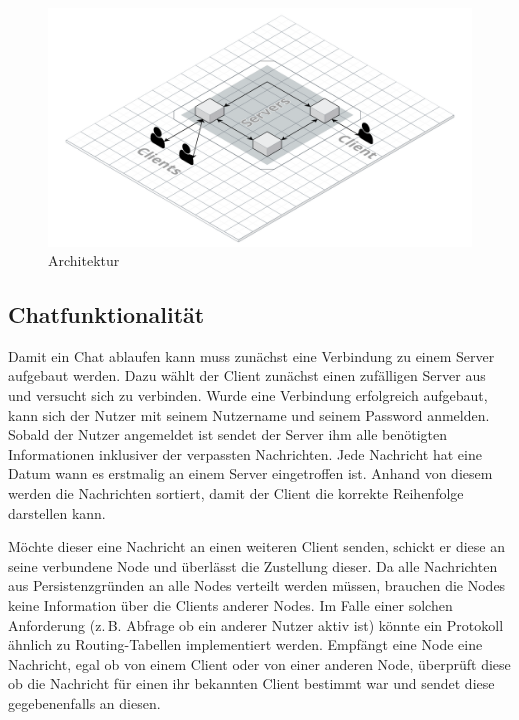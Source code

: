 



\begin{figure}[h]
    \centering
    \includegraphics[width=\textwidth]{architecture.png}
    
    \caption{Architektur}
    \label{}
\end{figure}

\subsection{Chatfunktionalität}
Damit ein Chat ablaufen kann muss zunächst eine Verbindung zu einem Server aufgebaut werden. Dazu wählt der Client zunächst einen zufälligen Server aus und versucht sich zu verbinden. Wurde eine Verbindung erfolgreich aufgebaut, kann sich der Nutzer mit seinem Nutzername und seinem Password anmelden. Sobald der Nutzer angemeldet ist sendet der Server ihm alle benötigten Informationen inklusiver der verpassten Nachrichten. Jede Nachricht hat eine Datum wann es erstmalig an einem Server eingetroffen ist. Anhand von diesem werden die Nachrichten sortiert, damit der Client die korrekte Reihenfolge darstellen kann.

Möchte dieser eine Nachricht an einen weiteren Client senden, schickt er diese an seine verbundene Node und überlässt die Zustellung dieser. Da alle Nachrichten aus Persistenzgründen an alle Nodes verteilt werden müssen, brauchen die Nodes keine Information über die Clients anderer Nodes. Im Falle einer solchen Anforderung (z.\,B. Abfrage ob ein anderer Nutzer aktiv ist) könnte ein Protokoll ähnlich zu Routing-Tabellen implementiert werden. Empfängt eine Node eine Nachricht, egal ob von einem Client oder von einer anderen Node, überprüft diese ob die Nachricht für einen ihr bekannten Client bestimmt war und sendet diese gegebenenfalls an diesen.

